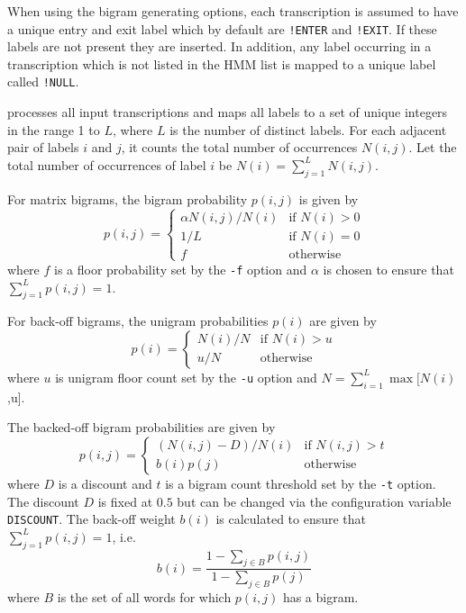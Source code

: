 
When using the bigram generating options, each transcription is 
assumed to have a unique entry and exit label which by default are
\texttt{!ENTER} and \texttt{!EXIT}.  If these labels are not present
they are inserted.  In addition, any label occurring in a transcription
which is not listed in the HMM list is mapped to a unique label called
\texttt{!NULL}.

 processes all input transcriptions and
maps all labels to a set of unique integers in the range 1 to $L$, where
$L$ is the number of distinct labels.  
For each adjacent pair of labels $i$
and $j$, it counts the total number of occurrences $N(i,j)$.
Let the total
number of occurrences of label $i$ be $N(i) = \sum_{j=1}^L N(i,j)$.

For matrix bigrams, the bigram probability $p(i,j)$ is given by
\[
   p(i,j) = \left\{
      \begin{array}{ll}
           \alpha N(i,j)/N(i) & \mbox{if $N(i) > 0$} \\
           1/L & \mbox{if $N(i) = 0$} \\
           f   & \mbox{otherwise}
       \end{array}
   \right. 
\]
where $f$ is a floor probability set by the \texttt{-f} option
and $\alpha$ is chosen to ensure that $\sum_{j=1}^L p(i,j) = 1$.

For back-off bigrams, the unigram probabilities $p(i)$ are given
by
\[
   p(i) = \left\{
      \begin{array}{ll}
           N(i)/N & \mbox{if $N(i) > u$} \\
                   u/N   & \mbox{otherwise}
       \end{array}
   \right. 
\]
where $u$ is unigram floor count set by the \texttt{-u} option
and $N = \sum_{i=1}^L \max [N(i)$,u].

The backed-off bigram probabilities are given by
\[
   p(i,j) = \left\{
      \begin{array}{ll}
           (N(i,j) - D )/N(i) & \mbox{if $N(i,j) > t$} \\
                  b(i) p(j)  & \mbox{otherwise}
       \end{array}
   \right. 
\]
where $D$ is a discount and $t$ is a bigram count threshold set
by the \texttt{-t} option.  The discount $D$ is fixed at $0.5$ 
but can be changed via the configuration variable \texttt{DISCOUNT}.
The back-off weight $b(i)$ is calculated to ensure 
that $\sum_{j=1}^L p(i,j) = 1$, i.e.
\[
  b(i) = \frac{1 - \sum_{j \in B} p(i,j)}{1 - \sum_{j \in B} p(j)}
\]
where $B$ is the set of all words for which $p(i,j)$ has a bigram.

